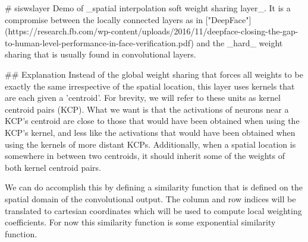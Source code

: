 # siswslayer
Demo of _spatial interpolation soft weight sharing layer_. 
It is a compromise between the locally connected layers as in ["DeepFace"](https://research.fb.com/wp-content/uploads/2016/11/deepface-closing-the-gap-to-human-level-performance-in-face-verification.pdf) 
and the _hard_ weight sharing that is usually found in 
convolutional layers.

## Explanation
Instead of the global weight sharing that forces all weights to be exactly the same irrespective of the
spatial location, this layer uses kernels that are each given a 'centroid'. For brevity, we will refer to these units as
kernel centroid pairs (KCP). What we want is that 
the activations of neurons near a KCP's centroid are close to those that would have been obtained when using
the KCP's kernel, and less like the activations that would have been obtained when using the kernels of more distant 
KCPs. Additionally, when a spatial location is somewhere in between two centroids, it should inherit some of
the weights of both kernel centroid pairs.

We can do accomplish this by defining a similarity function that is defined on the spatial domain of the convolutional
output. The column and row indices will be translated to cartesian coordinates which will be used to compute local 
weighting coefficients. For now this similarity function is some exponential similarity function.

